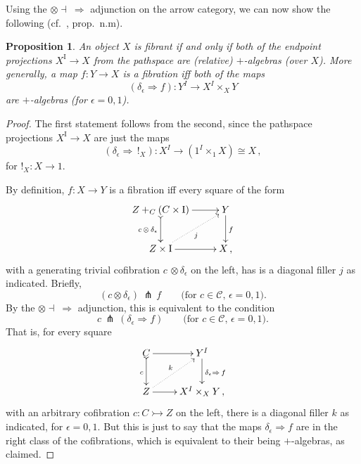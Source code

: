 \documentclass[11pt]{article}
\newcommand{\mono}{\ensuremath{\rightarrowtail}}
\newcommand{\I}{\ensuremath{\mathrm{I}}}
\newtheorem{proposition}[theorem]{Proposition}
\theoremstyle{remark}
\theoremstyle{definition}
\begin{document}
Using the $\otimes\dashv\ \Rightarrow$ adjunction on the arrow category, we can now show the following (cf.~\cite{GG}, prop.~n.m).

\begin{proposition}\label{prop:algequivfill}
An object $X$ is fibrant if and only if both of the endpoint  projections $X^\I \to X$ from the pathspace are (relative) $+$-algebras (over $X$). More generally, a map $f : Y\to X$ is a fibration iff both of the maps $$(\delta_\epsilon \Rightarrow f) : Y^I \to X^I\times_X Y$$ are $+$-algebras (for $\epsilon = 0,1$).
\end{proposition}
\begin{proof}
The first statement follows from the second, since the pathspace projections $X^\I \to X$  are just the maps 
$$(\delta_\epsilon \Rightarrow\, !_X) : X^I \to (1^I\times_1 X) \cong X\,,$$
for $!_X : X \to 1$.

By definition, $f : X\to Y$ is a fibration iff every square of the form
\begin{equation}
\xymatrix{
Z +_C (C\times\I) \ar@{>->}[d]_{c\, \otimes\, \delta_\epsilon} \ar[r] & Y \ar[d]^f \\
Z\times \I \ar@{.>}[ru]_{j} \ar[r] & X\,,
}
\end{equation}
with a generating trivial cofibration $c\, \otimes \delta_\epsilon$ on the left, has is a diagonal filler $j$ as indicated. Briefly,
\[
(c\otimes\delta_\epsilon)\, \pitchfork\, f \qquad\text{(for $c\in \mathcal{C}$, $\epsilon = 0,1$)}.
\]
By the $\otimes\dashv\ \Rightarrow$ adjunction, this is equivalent to the condition  
\[
c\, \pitchfork\, (\delta_\epsilon\!\Rightarrow\! f) \qquad\text{(for $c\in \mathcal{C}$, $\epsilon = 0,1$)}.
\]
That is, for every square 
\begin{equation*}
\xymatrix{
C \ar@{>->}[d]_{c} \ar[r] & Y^I \ar[d]^{\delta_\epsilon \Rightarrow\,f} \\
Z \ar@{.>}[ru]^{k} \ar[r] & X^I\times_X Y\,,
}
\end{equation*}
with an arbitrary cofibration $c : C \mono Z$ on the left, there is a diagonal filler $k$ as indicated, for  $\epsilon = 0,1$. 
But this is just to say that the maps $\delta_\epsilon\Rightarrow{f}$ are in the right class of the cofibrations, which is equivalent to their being $+$-algebras, as claimed.
\end{proof}
\end{document}
